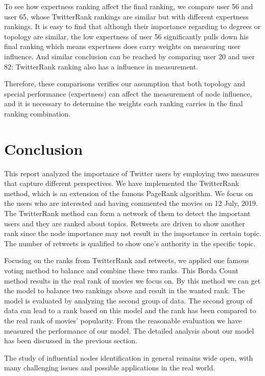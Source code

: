 \documentclass[conference]{IEEEtran}
\theoremstyle{definition}
\begin{document}
To see how expertness ranking affect the final ranking, we compare user 56 and user 65, whose TwitterRank rankings are similar but with different expertness rankings. It is easy to find that although their importance regarding to degrees or topology are similar, the low expertness of user 56 significantly pulls down his final ranking which means expertness does carry weights on measuring user influence. And similar conclusion can be reached by comparing user 20 and user 82: TwitterRank ranking also has a influence in measurement. \par
Therefore, these comparisons verifies our assumption that both topology and special performance (expertness) can affect the measurement of node influence, and it is necessary to determine the weights each ranking carries in the final ranking combination.

\section{Conclusion}

This report analyzed the importance of Twitter users by employing two measures that capture different perspectives. We have implemented the TwitterRank method, which is an extension of the famous PageRank algorithm. We focus on the users who are interested and having commented the movies on 12 July, 2019. The TwitterRank method can form a network of them to detect the important users and they are ranked about topics. Retweets are driven to show another rank since the node importance may not result in the importance in certain topic. The number of retweets is qualified to show one's authority in the specific topic.

Focusing on the ranks from TwitterRank and retweets, we applied one famous voting method to balance and combine these two ranks. This Borda Count method results in the real rank of movies we focus on. By this method we can get the model to balance two rankings above and result in the wanted rank. The model is evaluated by analyzing the second group of data. The second group of data can lead to a rank based on this model and the rank has been compared to the real rank of movies' popularity. From the reasonable evaluation we have measured the performance of our model. The detailed analysis about our model has been discussed in the previous section.  


The study of influential nodes identification in general remains wide open, with many challenging issues and possible applications in the real world.
\end{document}
